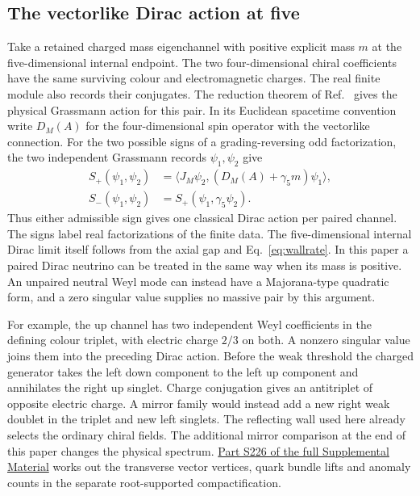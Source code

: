 \documentclass[aps,prd,reprint,onecolumn,nofootinbib,amsmath,amssymb]{revtex4-2}
\begin{document}
\subsection{The vectorlike Dirac action at five}
Take a retained charged mass eigenchannel with positive explicit mass $m$ at the five-dimensional internal endpoint. The two four-dimensional chiral coefficients have the same surviving colour and electromagnetic charges. The real finite module also records their conjugates. The reduction theorem of Ref.~\cite{chiralnote} gives the physical Grassmann action for this pair. In its Euclidean spacetime convention write $D_M(A)$ for the four-dimensional spin operator with the vectorlike connection. For the two possible signs of a grading-reversing odd factorization, the two independent Grassmann records $\psi_1,\psi_2$ give
\begin{equation}
\begin{aligned}
 S_+(\psi_1,\psi_2)
    &=\langle J_M\psi_2,(D_M(A)+\gamma_5m)\psi_1\rangle,\\
 S_-(\psi_1,\psi_2)&=S_+(\psi_1,\gamma_5\psi_2).
\end{aligned}
\end{equation}
Thus either admissible sign gives one classical Dirac action per paired channel. The signs label real factorizations of the finite data. The five-dimensional internal Dirac limit itself follows from the axial gap and Eq.~\eqref{eq:wallrate}. In this paper a paired Dirac neutrino can be treated in the same way when its mass is positive. An unpaired neutral Weyl mode can instead have a Majorana-type quadratic form, and a zero singular value supplies no massive pair by this argument.

For example, the up channel has two independent Weyl coefficients in the defining colour triplet, with electric charge $2/3$ on both. A nonzero singular value joins them into the preceding Dirac action. Before the weak threshold the charged generator takes the left down component to the left up component and annihilates the right up singlet. Charge conjugation gives an antitriplet of opposite electric charge. A mirror family would instead add a new right weak doublet in the triplet and new left singlets. The reflecting wall used here already selects the ordinary chiral fields. The additional mirror comparison at the end of this paper changes the physical spectrum. \href{supplemental.pdf}{Part S226 of the full Supplemental Material} works out the transverse vector vertices, quark bundle lifts and anomaly counts in the separate root-supported compactification.
\end{document}
